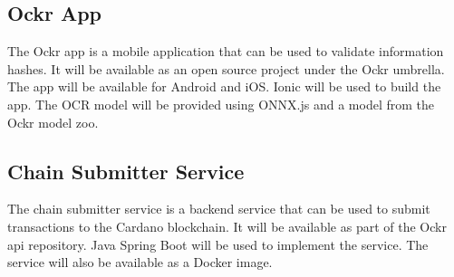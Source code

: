 \documentclass[../ockr-specification.tex]{subfiles}
\begin{document}
\subsection{Ockr App}

The Ockr app is a mobile application that can be used to validate information hashes. It will be available as an open source project under the Ockr umbrella. The app will be available for Android and iOS. Ionic will be used to build the app. The OCR model will be provided using ONNX.js and a model from the Ockr model zoo.

\subsection{Chain Submitter Service}

The chain submitter service is a backend service that can be used to submit transactions to the Cardano blockchain. It will be available as part of the Ockr api repository. Java Spring Boot will be used to implement the service. The service will also be available as a Docker image.

\newpage
\end{document}
